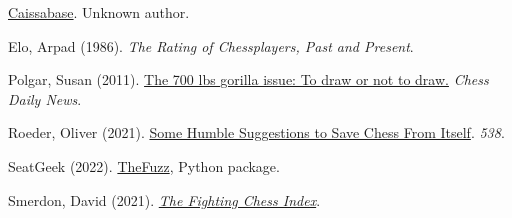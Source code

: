 \documentclass{article}
\begin{document}
\begin{thebibliography}{9}

\href{http://caissabase.co.uk/}{Caissabase}. Unknown author.

Elo, Arpad (1986). \textit{The Rating of Chessplayers, Past and Present}.

Polgar, Susan (2011). \href{https://chessdailynews.com/the-700-lbs-gorilla-issue-to-draw-or-not-to-draw/}{The 700 lbs gorilla issue: To draw or not to draw.} \textit{Chess Daily News}.

Roeder, Oliver (2021). \href{https://fivethirtyeight.com/features/some-humble-suggestions-to-save-chess-from-itself/}{Some Humble Suggestions to Save Chess From Itself}. \textit{538}.

SeatGeek (2022). \href{https://github.com/seatgeek/thefuzz}{TheFuzz}, Python package.

Smerdon, David (2021). \href{https://www.davidsmerdon.com/?p=2168}{\textit{The Fighting Chess Index}}.

\end{thebibliography}
\end{document}
